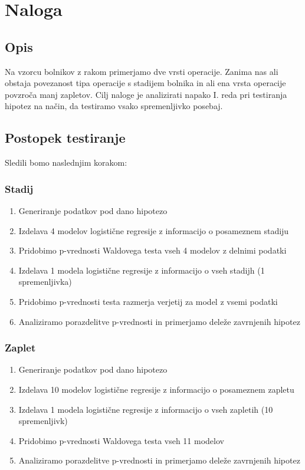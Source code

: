 \documentclass[letterpaper,11pt]{article}
\begin{document}
\section{Naloga}
\subsection{Opis}
Na vzorcu bolnikov z rakom primerjamo dve vrsti operacije. Zanima nas ali obstaja povezanost tipa operacije s stadijem bolnika in ali ena vrsta operacije povzroča manj zapletov. Cilj naloge je analizirati napako I. reda pri testiranja hipotez na način, da testiramo vsako spremenljivko posebaj. 

\subsection{Postopek testiranje}
Sledili bomo naslednjim korakom:

\subsubsection{Stadij}
\begin{enumerate}
  \item Generiranje podatkov pod dano hipotezo
  \item Izdelava 4 modelov logistične regresije z informacijo o posameznem stadiju
  \item Pridobimo p-vrednosti Waldovega testa vseh 4 modelov z delnimi podatki
  \item Izdelava 1 modela logistične regresije z informacijo o vseh stadijh (1 spremenljivka)
  \item Pridobimo p-vrednosti testa razmerja verjetij za model z vsemi podatki
  \item Analiziramo porazdelitve p-vrednosti in primerjamo deleže zavrnjenih hipotez
\end{enumerate}

\subsubsection{Zaplet}
\begin{enumerate}
  \item Generiranje podatkov pod dano hipotezo
  \item Izdelava 10 modelov logistične regresije z informacijo o posameznem zapletu
  \item Izdelava 1 modela logistične regresije z informacijo o vseh zapletih (10 spremenljivk)
  \item Pridobimo p-vrednosti Waldovega testa vseh 11 modelov
  \item Analiziramo porazdelitve p-vrednosti in primerjamo deleže zavrnjenih hipotez
\end{enumerate}
\end{document}
